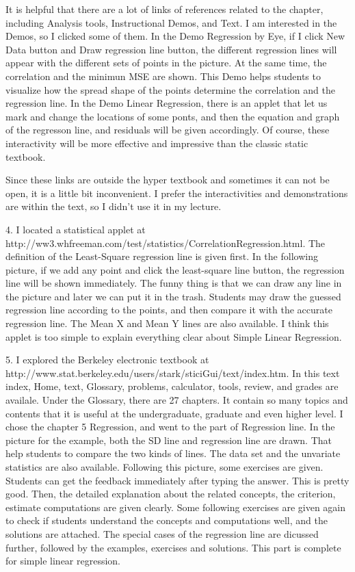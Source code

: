 It is helpful that there are a lot of links of references related to the 
chapter, including Analysis tools, Instructional Demos, and Text. I am 
interested in the Demos, so I clicked some of them. In the Demo Regression by 
Eye, if I click New Data button and Draw regression line button, the different 
regression lines will appear with the different sets of points in the picture. 
At the same time, the correlation and the minimun MSE are shown. This Demo 
helps students to visualize how the spread shape of the points determine the 
correlation and the regression line. In the Demo Linear Regression, there is 
an applet that let us mark and change the locations of some ponts, and then 
the equation and graph of the regresson line, and residuals will be given 
accordingly. Of course, these interactivity will be more effective and 
impressive than the classic static textbook.

Since these links are outside the hyper textbook and sometimes it can not be 
open, it is a little bit inconvenient. I prefer the interactivities and 
demonstrations are within the text, so I didn't use it in my lecture.

4. I located a statistical applet at 
http://ww3.whfreeman.com/test/statistics/CorrelationRegression.html. The 
definition of the Least-Square regression line is given first. In the 
following picture, if we add any point and click the least-square line button, 
the regression line will be shown immediately. The funny thing is that we can 
draw any line in the picture and later we can put it in the trash. Students 
may draw the guessed regression line according to the points, and then compare 
it with the accurate regression line. The Mean X and Mean Y lines are also 
available. I think this applet is too simple to explain everything clear about 
Simple Linear Regression.

5. I explored the Berkeley electronic textbook at 
http://www.stat.berkeley.edu/users/stark/sticiGui/text/index.htm. In this text 
index, Home, text, Glossary, problems, calculator, tools, review, and grades 
are availale. Under the Glossary, there are 27 chapters. It contain so many 
topics and contents that it is useful at the undergraduate, graduate and even 
higher level. I chose the chapter 5 Regression, and went to the part of 
Regression line. In the picture for the example, both the SD line and 
regression line are drawn. That help students to compare the two kinds of 
lines. The data set and the unvariate statistics are also available. Following 
this picture, some exercises are given. Students can get the feedback 
immediately after typing the answer. This is pretty good. Then, the detailed 
explanation about the related concepts, the criterion, estimate computations 
are given clearly. Some following exercises are given again to check if 
students understand the concepts and computations well, and the solutions are 
attached. The special cases of the regression line are dicussed further, 
followed by the examples, exercises and solutions. This part is complete for 
simple linear regression.

